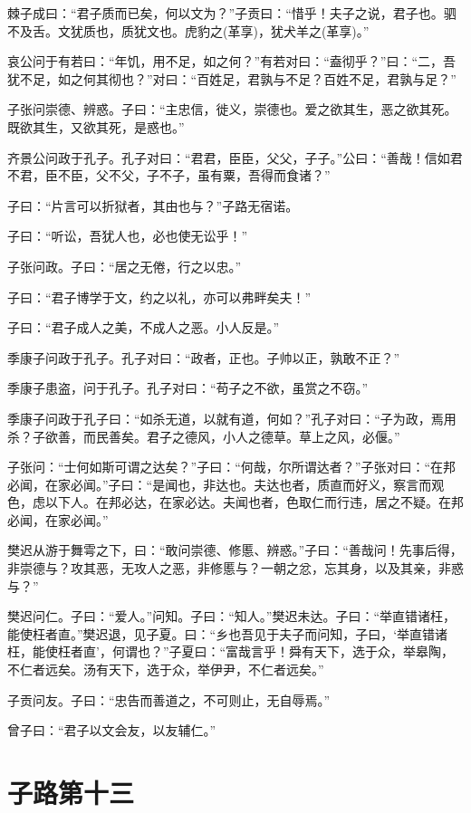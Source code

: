 \documentclass[twoside,openany]{book}
\begin{document}
棘子成曰：“君子质而已矣，何以文为？”子贡曰：“惜乎！夫子之说，君子也。驷不及舌。文犹质也，质犹文也。虎豹之(革享)，犹犬羊之(革享)。”

哀公问于有若曰：“年饥，用不足，如之何？”有若对曰：“盍彻乎？”曰：“二，吾犹不足，如之何其彻也？”对曰：“百姓足，君孰与不足？百姓不足，君孰与足？”

子张问崇德、辨惑。子曰：“主忠信，徙义，崇德也。爱之欲其生，恶之欲其死。既欲其生，又欲其死，是惑也。”

齐景公问政于孔子。孔子对曰：“君君，臣臣，父父，子子。”公曰：“善哉！信如君不君，臣不臣，父不父，子不子，虽有粟，吾得而食诸？”

子曰：“片言可以折狱者，其由也与？”子路无宿诺。

子曰：“听讼，吾犹人也，必也使无讼乎！”

子张问政。子曰：“居之无倦，行之以忠。”

子曰：“君子博学于文，约之以礼，亦可以弗畔矣夫！”

子曰：“君子成人之美，不成人之恶。小人反是。”

季康子问政于孔子。孔子对曰：“政者，正也。子帅以正，孰敢不正？”

季康子患盗，问于孔子。孔子对曰：“苟子之不欲，虽赏之不窃。”

季康子问政于孔子曰：“如杀无道，以就有道，何如？”孔子对曰：“子为政，焉用杀？子欲善，而民善矣。君子之德风，小人之德草。草上之风，必偃。”

子张问：“士何如斯可谓之达矣？”子曰：“何哉，尔所谓达者？”子张对曰：“在邦必闻，在家必闻。”子曰：“是闻也，非达也。夫达也者，质直而好义，察言而观色，虑以下人。在邦必达，在家必达。夫闻也者，色取仁而行违，居之不疑。在邦必闻，在家必闻。”

樊迟从游于舞雩之下，曰：“敢问崇德、修慝、辨惑。”子曰：“善哉问！先事后得，非崇德与？攻其恶，无攻人之恶，非修慝与？一朝之忿，忘其身，以及其亲，非惑与？”

樊迟问仁。子曰：“爱人。”问知。子曰：“知人。”樊迟未达。子曰：“举直错诸枉，能使枉者直。”樊迟退，见子夏。曰：“乡也吾见于夫子而问知，子曰，‘举直错诸枉，能使枉者直’，何谓也？”子夏曰：“富哉言乎！舜有天下，选于众，举皋陶，不仁者远矣。汤有天下，选于众，举伊尹，不仁者远矣。”

子贡问友。子曰：“忠告而善道之，不可则止，无自辱焉。”

曾子曰：“君子以文会友，以友辅仁。” 

\chapter{子路第十三}\label{ch13}
\end{document}

